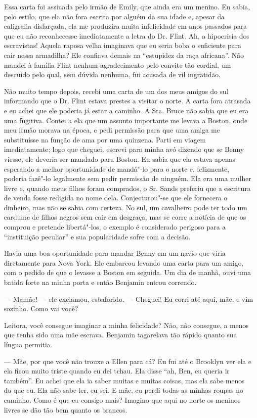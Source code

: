 Essa carta foi assinada pelo irmão de
Emily, que ainda era um menino. Eu sabia, pelo estilo, que ela não fora
escrita por alguém da sua idade e, apesar da caligrafia disfarçada, ela
me produzira muita infelicidade em anos passados para que eu não
reconhecesse imediatamente a letra do Dr. Flint. Ah, a hipocrisia dos
escravistas! Aquela raposa velha imaginava que eu seria boba o
suficiente para cair nessa armadilha? Ele confiava demais na ``estupidez
da raça africana''. Não mandei à família Flint nenhum agradecimento pelo
convite tão cordial, um descuido pelo qual, sem dúvida nenhuma, fui
acusada de vil ingratidão.

Não muito tempo depois, recebi uma
carta de um dos meus amigos do sul informando que o Dr. Flint estava
prestes a visitar o norte. A carta fora atrasada e eu achei que ele
poderia já estar a caminho. A Sra. Bruce não sabia que eu era uma
fugitiva. Contei a ela que um assunto importante me levava a Boston,
onde meu irmão morava na época, e pedi permissão para que uma amiga me
substituísse na função de ama por uma quinzena. Parti em viagem
imediatamente; logo que cheguei, escrevi para minha avó dizendo que se
Benny viesse, ele deveria ser mandado para Boston. Eu sabia que ela
estava apenas esperando a melhor oportunidade de mandá"-lo para o norte
e, felizmente, poderia fazê"-lo legalmente sem pedir permissão de
ninguém. Ela era uma mulher livre e, quando meus filhos foram comprados,
o Sr. Sands preferiu que a escritura de venda fosse redigida no nome
dela. Conjecturou"-se que ele fornecera o dinheiro, mas não se sabia com
certeza. No sul, um cavalheiro pode ter todo um cardume de filhos negros
sem cair em desgraça, mas se corre a notícia de que os comprou e
pretende libertá"-los, o exemplo é considerado perigoso para a
``instituição peculiar'' e sua popularidade sofre com a decisão.

Havia uma boa oportunidade para mandar
Benny em um navio que viria diretamente para Nova York. Ele embarcou
levando uma carta para um amigo, com o pedido de que o levasse a Boston
em seguida. Um dia de manhã, ouvi uma batida forte na minha porta e
então Benjamin entrou correndo.

--- Mamãe! --- ele exclamou, esbaforido. --- Cheguei! Eu corri até aqui,
mãe, e vim sozinho. Como vai você?

Leitora, você consegue imaginar a minha
felicidade? Não, não consegue, a menos que tenha sido uma mãe escrava.
Benjamin tagarelava tão rápido quanto sua língua permitia.

--- Mãe, por que você não trouxe a Ellen para cá? Eu fui até o Brooklyn
ver ela e ela ficou muito triste quando eu dei tchau. Ela disse ``ah,
Ben, eu queria ir também''. Eu achei que ela ia saber muitas e muitas
coisas, mas ela sabe menos do que eu. Ela não sabe ler, eu sei. E mãe,
eu perdi todas as minhas roupas no caminho. Como é que eu consigo mais?
Imagino que aqui no norte os meninos livres se dão tão bem quanto os
brancos.

